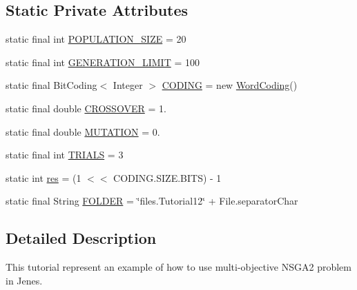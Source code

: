 \subsection*{Static Private Attributes}
\begin{DoxyCompactItemize}
\item 
static final int \hyperlink{classjenes_1_1tutorials_1_1old_1_1problem12_1_1_multi_objective_problem_a99a8a3d61d1075675f78916b3854d812}{P\-O\-P\-U\-L\-A\-T\-I\-O\-N\-\_\-\-S\-I\-Z\-E} = 20
\item 
static final int \hyperlink{classjenes_1_1tutorials_1_1old_1_1problem12_1_1_multi_objective_problem_a75371890b1a3cad7c72464217e1d40bf}{G\-E\-N\-E\-R\-A\-T\-I\-O\-N\-\_\-\-L\-I\-M\-I\-T} = 100
\item 
static final Bit\-Coding$<$ Integer $>$ \hyperlink{classjenes_1_1tutorials_1_1old_1_1problem12_1_1_multi_objective_problem_afb98f6a8f4a49545e794e12bc068f0d2}{C\-O\-D\-I\-N\-G} = new \hyperlink{classjenes_1_1chromosome_1_1codings_1_1_word_coding}{Word\-Coding}()
\item 
static final double \hyperlink{classjenes_1_1tutorials_1_1old_1_1problem12_1_1_multi_objective_problem_adf65303714e6888c5b091e3a184dfbc1}{C\-R\-O\-S\-S\-O\-V\-E\-R} = 1.
\item 
static final double \hyperlink{classjenes_1_1tutorials_1_1old_1_1problem12_1_1_multi_objective_problem_a99745284ba05404863148950017b761d}{M\-U\-T\-A\-T\-I\-O\-N} = 0.
\item 
static final int \hyperlink{classjenes_1_1tutorials_1_1old_1_1problem12_1_1_multi_objective_problem_a8d808c0e870ab23a05cd858695d256c9}{T\-R\-I\-A\-L\-S} = 3
\item 
static int \hyperlink{classjenes_1_1tutorials_1_1old_1_1problem12_1_1_multi_objective_problem_a07c4d7ac56183ed3ae3d023e7e624b75}{res} = (1 $<$$<$ C\-O\-D\-I\-N\-G.\-S\-I\-Z\-E.\-B\-I\-T\-S) -\/ 1
\item 
static final String \hyperlink{classjenes_1_1tutorials_1_1old_1_1problem12_1_1_multi_objective_problem_aa2f49784fd882a6a6ee3dea8ad5aa2d3}{F\-O\-L\-D\-E\-R} = \char`\"{}files.\-Tutorial12\char`\"{} + File.\-separator\-Char
\end{DoxyCompactItemize}


\subsection{Detailed Description}
This tutorial represent an example of how to use multi-\/objective N\-S\-G\-A2 problem in Jenes. 


